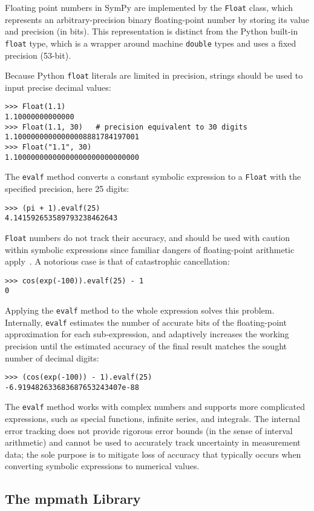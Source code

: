 Floating point numbers in SymPy are implemented by the \texttt{Float} class,
which represents an arbitrary-precision binary floating-point number by
storing its value and precision (in bits). This representation is distinct
from the Python built-in \texttt{float} type, which is a wrapper around
machine \texttt{double} types and uses a fixed precision (53-bit).

Because Python \texttt{float} literals are limited in precision, strings
should be used to input precise decimal values:
\begin{verbatim}
>>> Float(1.1)
1.10000000000000
>>> Float(1.1, 30)   # precision equivalent to 30 digits
1.10000000000000008881784197001
>>> Float("1.1", 30)
1.10000000000000000000000000000
\end{verbatim}
The \texttt{evalf} method converts a constant symbolic expression to a
\texttt{Float} with the specified precision, here 25 digits:
\begin{verbatim}
>>> (pi + 1).evalf(25)
4.141592653589793238462643
\end{verbatim}
\texttt{Float} numbers do not track their accuracy,
and should be used with caution within symbolic expressions
since familiar dangers of floating-point arithmetic apply~\cite{goldberg1991every}.
A notorious case is that of catastrophic cancellation:
\begin{verbatim}
>>> cos(exp(-100)).evalf(25) - 1
0
\end{verbatim}
Applying the \texttt{evalf} method to the whole expression solves
this problem. Internally, \texttt{evalf} estimates the number of accurate
bits of the floating-point
approximation for each sub-expression, and adaptively increases the
working precision until the estimated accuracy of the
final result matches the sought number of decimal digits:
\begin{verbatim}
>>> (cos(exp(-100)) - 1).evalf(25)
-6.919482633683687653243407e-88
\end{verbatim}
The \texttt{evalf} method works with complex numbers and supports
more complicated expressions, such as
special functions, infinite series, and integrals.
The internal error tracking does not provide rigorous error bounds
(in the sense of interval arithmetic) and cannot be used to accurately track
uncertainty in measurement data;
the sole purpose is to mitigate loss of accuracy that typically occurs
when converting symbolic expressions to numerical values.

\subsection{The mpmath Library}
\label{sec:mpmath}

